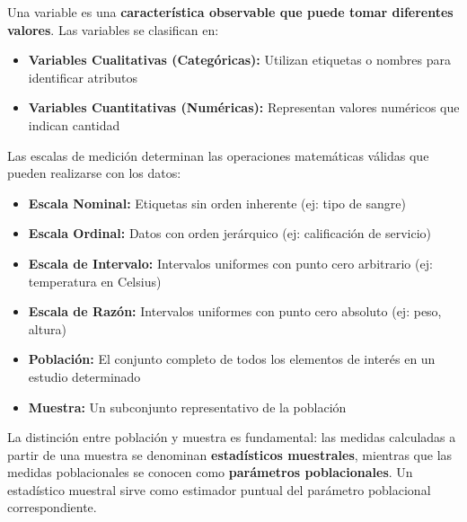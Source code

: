 \begin{definition}[Variable]
Una variable es una \textbf{característica observable que puede tomar diferentes valores}. Las variables se clasifican en:
\begin{itemize}
    \item \textbf{Variables Cualitativas (Categóricas):} Utilizan etiquetas o nombres para identificar atributos
    \item \textbf{Variables Cuantitativas (Numéricas):} Representan valores numéricos que indican cantidad
\end{itemize}
\end{definition}

\begin{definition}
Las escalas de medición determinan las operaciones matemáticas válidas que pueden realizarse con los datos:
\begin{itemize}
    \item \textbf{Escala Nominal:} Etiquetas sin orden inherente (ej: tipo de sangre)
    \item \textbf{Escala Ordinal:} Datos con orden jerárquico (ej: calificación de servicio)
    \item \textbf{Escala de Intervalo:} Intervalos uniformes con punto cero arbitrario (ej: temperatura en Celsius)
    \item \textbf{Escala de Razón:} Intervalos uniformes con punto cero absoluto (ej: peso, altura)
\end{itemize}
\end{definition}

\begin{definition}
\begin{itemize}
    \item \textbf{Población:} El conjunto completo de todos los elementos de interés en un estudio determinado
    \item \textbf{Muestra:} Un subconjunto representativo de la población
\end{itemize}
\end{definition}

\begin{remark}
La distinción entre población y muestra es fundamental: las medidas calculadas a partir de una muestra se denominan \textbf{estadísticos muestrales}, mientras que las medidas poblacionales se conocen como \textbf{parámetros poblacionales}. Un estadístico muestral sirve como estimador puntual del parámetro poblacional correspondiente.
\end{remark}

